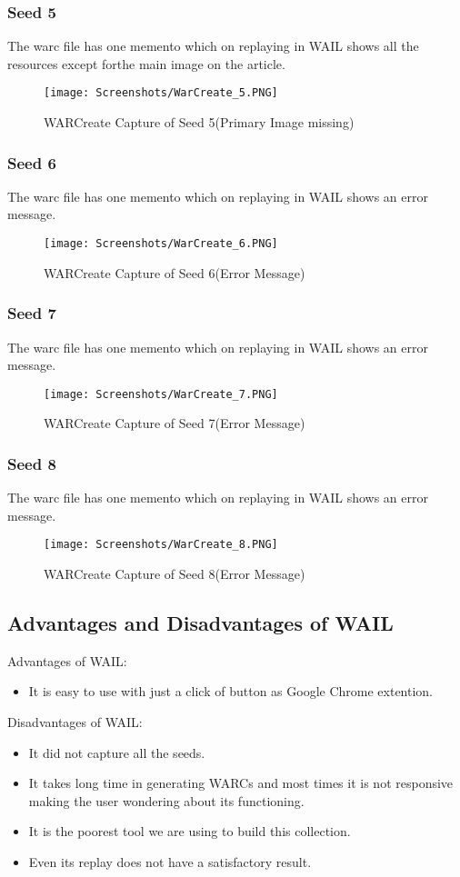 \documentclass[11pt,journal,compsoc,onecolumn]{IEEEtran}
\begin{document}
\subsubsection{Seed 5}
The warc file has one memento which on replaying in WAIL shows all the resources except forthe main image on the article. 
 \begin{figure}[ht] 
  \centering
  \texttt{[image: Screenshots/WarCreate\_5.PNG]}
  \caption{WARCreate Capture of Seed 5(Primary Image missing)}
  \label{fig:60}
\end{figure}
\subsubsection{Seed 6}
The warc file has one memento which on replaying in WAIL shows an error message. 
 \begin{figure}[ht] 
  \centering
  \texttt{[image: Screenshots/WarCreate\_6.PNG]}
  \caption{WARCreate Capture of Seed 6(Error Message)}
  \label{fig:61}
\end{figure}
\subsubsection{Seed 7}
The warc file has one memento which on replaying in WAIL shows an error message. 
 \begin{figure}[ht] 
  \centering
  \texttt{[image: Screenshots/WarCreate\_7.PNG]}
  \caption{WARCreate Capture of Seed 7(Error Message)}
  \label{fig:62}
\end{figure}
\subsubsection{Seed 8}
The warc file has one memento which on replaying in WAIL shows an error message. 
 \begin{figure}[ht] 
  \centering
  \texttt{[image: Screenshots/WarCreate\_8.PNG]}
  \caption{WARCreate Capture of Seed 8(Error Message)}
  \label{fig:63}
\end{figure}
\subsection{Advantages and Disadvantages of WAIL}
Advantages of WAIL:
\begin{itemize}
\item It is easy to use with just a click of button as Google Chrome extention.

\end{itemize}
Disadvantages of WAIL:
\begin{itemize}
\item It did not capture all the seeds.
\item It takes long time in generating WARCs and most times it is not responsive making the user wondering about its functioning.
\item It is the poorest tool we are using to build this collection.
\item Even its replay does not have a satisfactory result.
\end{itemize}
\end{document}
